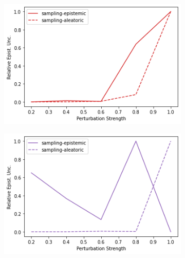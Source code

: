 \begin{figure}
    \begin{subfigure}{.24\textwidth}
        \includegraphics[width=\textwidth]{sections/011_icml2022/resources/transition_shift-DropOut-LunarLanderShift-v0-mean_epistemic_uncertainty_.png}
    \end{subfigure}
    \begin{subfigure}{.24\textwidth}
        \includegraphics[width=\textwidth]{sections/011_icml2022/resources/transition_shift-Ensemble-LunarLanderShift-v0-mean_epistemic_uncertainty_.png}
    \end{subfigure}
    \begin{subfigure}{.24\textwidth}

\end{subfigure}
\end{figure}
